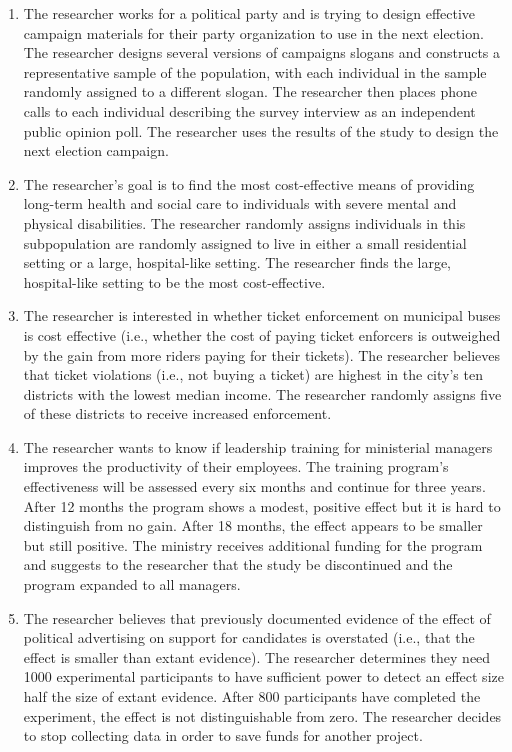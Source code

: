 \documentclass[12pt,a4]{article}
\begin{document}
\begin{enumerate}
\item The researcher works for a political party and is trying to design effective campaign materials for their party organization to use in the next election. The researcher designs several versions of campaigns slogans and constructs a representative sample of the population, with each individual in the sample randomly assigned to a different slogan. The researcher then places phone calls to each individual describing the survey interview as an independent public opinion poll. The researcher uses the results of the study to design the next election campaign. %

\item The researcher's goal is to find the most cost-effective means of providing long-term health and social care to individuals with severe mental and physical disabilities. The researcher randomly assigns individuals in this subpopulation are randomly assigned to live in either a small residential setting or a large, hospital-like setting. The researcher finds the large, hospital-like setting to be the most cost-effective. %

\item The researcher is interested in whether ticket enforcement on municipal buses is cost effective (i.e., whether the cost of paying ticket enforcers is outweighed by the gain from more riders paying for their tickets). The researcher believes that ticket violations (i.e., not buying a ticket) are highest in the city's ten districts with the lowest median income. The researcher randomly assigns five of these districts to receive increased enforcement. %

\item The researcher wants to know if leadership training for ministerial managers improves the productivity of their employees. The training program's effectiveness will be assessed every six months and continue for three years. After 12 months the program shows a modest, positive effect but it is hard to distinguish from no gain. After 18 months, the effect appears to be smaller but still positive. The ministry receives additional funding for the program and suggests to the researcher that the study be discontinued and the program expanded to all managers. %

\item The researcher believes that previously documented evidence of the effect of political advertising on support for candidates is overstated (i.e., that the effect is smaller than extant evidence). The researcher determines they need 1000 experimental participants to have sufficient power to detect an effect size half the size of extant evidence. After 800 participants have completed the experiment, the effect is not distinguishable from zero. The researcher decides to stop collecting data in order to save funds for another project. %


\end{enumerate}
\end{document}
